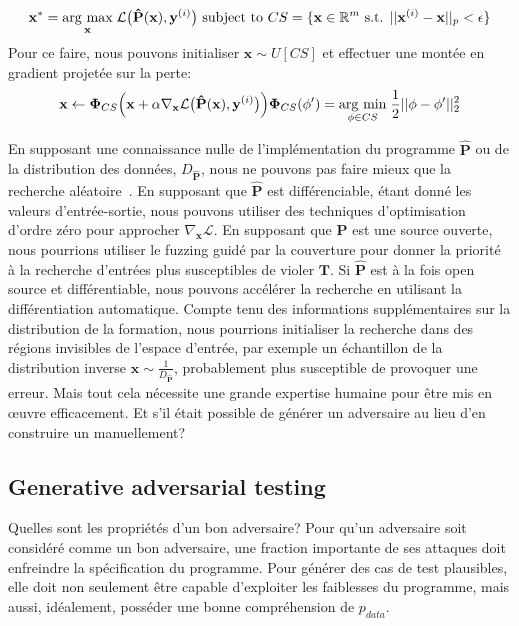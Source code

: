 %
\begin{equation}
\mathbf{x}^* = \underset{\mathbf{x}}{\operatorname{arg}\,\operatorname{max}}\;\mathcal{L}\big(\mathbf{\hat P}(\mathbf{x}), \mathbf{y}^{(i)}\big) \text{ subject to } CS = \{\mathbf{x} \in \mathbb{R}^m \text{ s.t. } ||\mathbf{x}^{(i)} - \mathbf{x}||_p    < \epsilon\}
\end{equation}
%
Pour ce faire, nous pouvons initialiser $\mathbf{x} \sim U[CS]$ et effectuer une montée en gradient projetée sur la perte:
%
\begin{equation}\label{eq:projected_gd}
\mathbf x \leftarrow \bm\Phi_{CS}\Big(\mathbf x + \alpha\mathbf\nabla_{\mathbf x} \mathcal{L}\big(\mathbf{\hat P}(\mathbf{x}), \mathbf{y}^{(i)}\big)\Big)
\bm\Phi_{CS}(\mathbf \phi') = \underset{\mathbf \phi \in CS}{\operatorname{arg}\,\operatorname{min}}\;\frac{1}{2}||\mathbf \phi - \mathbf \phi'||^2_2
\end{equation}
%

En supposant une connaissance nulle de l'implémentation du programme $\mathbf{\hat P}$ ou de la distribution des données, $D_{\mathbf{\hat P}}$, nous ne pouvons pas faire mieux que la recherche aléatoire~\citep{wolpert1997no}. En supposant que $\mathbf{\hat P}$ est différenciable, étant donné les valeurs d'entrée-sortie, nous pouvons utiliser des techniques d'optimisation d'ordre zéro pour approcher $\nabla_{\mathbf{x}}\mathcal{L}$. En supposant que $\mathbf{\hat P}$ est une source ouverte, nous pourrions utiliser le fuzzing guidé par la couverture pour donner la priorité à la recherche d'entrées plus susceptibles de violer $\mathbf T$. Si $\mathbf{\hat P}$ est à la fois open source et différentiable, nous pouvons accélérer la recherche en utilisant la différentiation automatique. Compte tenu des informations supplémentaires sur la distribution de la formation, nous pourrions initialiser la recherche dans des régions invisibles de l'espace d'entrée, par exemple un échantillon de la distribution inverse $\mathbf x \sim \frac{1}{D_{\mathbf{\hat P}}}$, probablement plus susceptible de provoquer une erreur. Mais tout cela nécessite une grande expertise humaine pour être mis en œuvre efficacement. Et s'il était possible de générer un adversaire au lieu d'en construire un manuellement?

\subsection{Generative adversarial testing}

Quelles sont les propriétés d'un bon adversaire? Pour qu'un adversaire soit considéré comme un bon adversaire, une fraction importante de ses attaques doit enfreindre la spécification du programme. Pour générer des cas de test plausibles, elle doit non seulement être capable d'exploiter les faiblesses du programme, mais aussi, idéalement, posséder une bonne compréhension de $p_{data}$.

